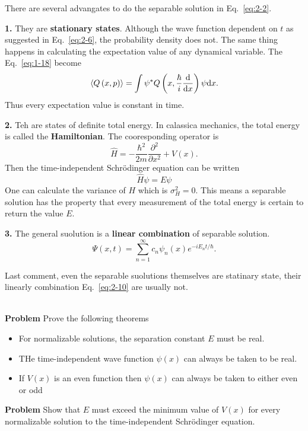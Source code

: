 There are several advangates to do the separable solution in Eq.~\eqref{eq:2-2}.

\textbf{1.} They are \textbf{stationary states}.
Although the wave function dependent on $t$ as suggested in Eq.~\eqref{eq:2-6}, the probability density does not.
The same thing happens in calculating the expectation value of any dynamical variable.
The Eq.~\eqref{eq:1-18} become
\begin{equation}
  \label{eq:2-7}
  \expval{ Q \left( x,p \right) } = \int \psi^{*} Q \left( x, \frac{\hbar}{i} \frac{\dd}{\dd x} \right) \psi \dd x.
\end{equation}
Thus every expectation value is constant in time.

\textbf{2.} Teh are states of definite total energy.
In calassica mechanics, the total energy is called the \textbf{Hamiltonian}.
The cooresponding operator is
\begin{equation}
  \label{eq:2-8}
  \hat{H} = - \frac{\hbar^{2}}{2m} \frac{\partial^{2}}{\partial x^{2}} + V \left( x \right).
\end{equation}
Then the time-independent Schr\"odinger equation can be written
\begin{equation}
  \label{eq:2-9}
  \hat{H} \psi = E\psi
\end{equation}
One can calculate the variance of $H$ which is $\sigma_{H}^{2}=0$.
This means a separable solution has the property that every measurement of the total energy is certain to return the value $E$.

\textbf{3.} The general suolution is a \textbf{linear combination} of separable solution.
\begin{equation}
  \label{eq:2-10}
  \Psi \left( x,t \right) = \sum_{n=1}^{\infty} c_{n} \psi_{n} \left( x \right) e^{-i E_{n}t /\hbar}.
\end{equation}

Last comment, even the separable suolutions themselves are statinary state, their linearly combination Eq.~\eqref{eq:2-10} are usually not.

\begin{fullwidth}
  \hrulefill\\
  \textbf{Problem} Prove the following theorems
  \begin{itemize}
    \item For normalizable solutions, the separation constant $E$ must be real.
    \item THe time-independent wave function $\psi \left( x \right)$ can always be taken to be real.
    \item If $V \left( x \right)$ is an even function then $\psi \left( x \right)$ can always be taken to either even or odd
  \end{itemize}

  \textbf{Problem} Show that $E$ must exceed the minimum value of $V \left( x \right)$ for every normalizable solution to the time-independent Schr\"odinger equation.
  \\ \hrulefill
\end{fullwidth}

